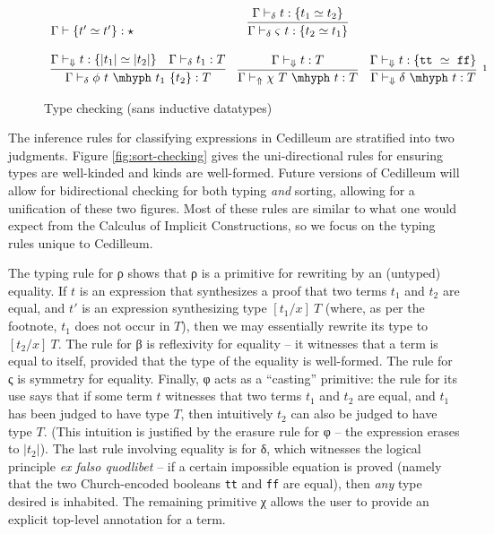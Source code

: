 \documentclass{article}
\newcommand{\absu}[3]{{#1}\, #2.\, #3}
\newcommand{\decdir}{\vdash_{\delta}}
\newcommand{\decsyn}{\vdash_{\Uparrow}}
\newcommand{\decchk}{\vdash_{\Downarrow}}
\begin{document}
\begin{figure}[h!]
\[\begin{array}{lcr}
        { \Gamma \vdash \{ t' \simeq t' \} : \star }
      & \infer
        { \Gamma \decdir \varsigma\ t : \{ t_2 \simeq t_1 \} }
        { \Gamma \decdir t : \{ t_1 \simeq t_2 \}}
      \\ \\ \infer
      { \Gamma \decdir \phi\ t\ \mhyph\ t_1\ \{t_2\} : T}
      { \Gamma \decchk t : \{ |t_1| \simeq |t_2| \}
        & \Gamma \decdir t_1 : T}
      & \infer
        { \Gamma \decsyn \chi\ T\ \mhyph\ t : T }
        { \Gamma \decchk t : T }
      & \infer[\footnotemark]
        { \Gamma \decchk \delta\ \mhyph\ t : T }
        { \Gamma \decchk t : \{ \texttt{tt}\ \simeq\ \texttt{ff} \}}
    \end{array}
  \]
  \caption{Type checking \fbox{$\Gamma \decdir s : C$} (sans inductive datatypes)}
  \label{fig:type-checking}
\end{figure}
\footnotetext{Where $\texttt{tt} = \absu{\lambda}{x}{\absu{\lambda}{y}{x}}$ and
  $\texttt{ff} = \absu{\lambda}{x}{\absu{\lambda}{y}{y}}$}

The inference rules for classifying expressions in Cedilleum are stratified into
two judgments. Figure \ref{fig:sort-checking} gives the uni-directional rules
for ensuring types are well-kinded and kinds are well-formed. Future versions of
Cedilleum will allow for bidirectional checking for both typing \textit{and}
sorting, allowing for a unification of these two figures. Most of these rules
are similar to what one would expect from the Calculus of Implicit
Constructions, so we focus on the typing rules unique to Cedilleum.

The typing rule for ρ shows that ρ is a primitive for rewriting by an (untyped)
equality. If $t$ is an expression that synthesizes a proof that two terms $t_1$
and $t_2$ are equal, and $t'$ is an expression synthesizing type $[t_1/x]\ T$
(where, as per the footnote, $t_1$ does not occur in $T$), then we may
essentially rewrite its type to $[t_2/x]\ T$. The rule for β is reflexivity for
equality -- it witnesses that a term is equal to itself, provided that the type
of the equality is well-formed. The rule for ς is symmetry for equality.
Finally, φ acts as a ``casting'' primitive: the rule for its use says that if
some term $t$ witnesses that two terms $t_1$ and $t_2$ are equal, and $t_1$ has
been judged to have type $T$, then intuitively $t_2$ can also be judged to have
type $T$. (This intuition is justified by the erasure rule for φ -- the
expression erases to $|t_2|$). The last rule involving equality is for δ, which
witnesses the logical principle \textit{ex falso quodlibet} -- if a certain
impossible equation is proved (namely that the two Church-encoded booleans
\texttt{tt} and \texttt{ff} are equal), then \textit{any} type desired is
inhabited. The remaining primitive χ allows the user to provide an
explicit top-level annotation for a term.
\end{document}
